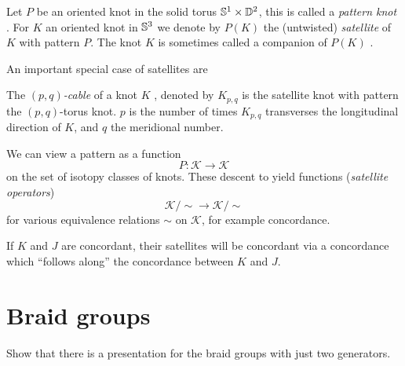 \citep{cochran2014injectivity}

Let $P$ be an oriented knot in the solid torus $\mathbb{S}^{1} \times \mathbb{D}^{2}$,
this is called a \textit{pattern knot} .
For $K$ an oriented knot in $\mathbb{S}^{3}$ we denote by $P(K)$
the (untwisted) \textit{satellite}  of $K$
with pattern $P$. The knot $K$ is sometimes called
a companion
of $P(K)$ \citep[p. 10]{lickorish2012introduction}.

An important special case of satellites are
\begin{definition}[$(p,q)$-cables]
	The \textit{$(p,q)$-cable} of a knot $K$
	,
	denoted by $K_{p, q}$
	is the satellite knot with pattern the $(p, q)$-torus knot.
	$p$ is the number of times $K_{p, q}$ transverses
	the longitudinal direction of $K$,
	and $q$ the meridional number.
\end{definition}

We can view a pattern as a function
\begin{equation*}
	P \colon \mathcal{K} \rightarrow \mathcal{K}
\end{equation*}
on the set of isotopy classes of
knots.
These descent to yield functions (\textit{satellite operators})
\begin{equation*}
	\mathcal{K} / \sim \rightarrow \mathcal{K}/ \sim
\end{equation*}
for various equivalence relations $\sim$ on $\mathcal{K}$, for example
concordance.

If $K$ and $J$ are concordant, their satellites will be concordant
via a concordance which ``follows along'' the concordance between
$K$ and $J$.



\section{Braid groups}

\begin{exercise}
	Show that there is a presentation for the braid groups
	with just two generators.
\end{exercise}

